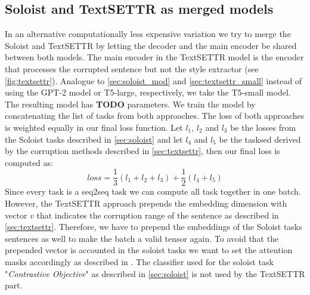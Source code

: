 \documentclass[twocolumn]{tum-article}
\begin{document}
\subsection{Soloist and TextSETTR as merged models}
In an alternative computationally less expensive variation we try to merge the Soloist and TextSETTR by letting the decoder and the main encoder be shared between both models. The main encoder in the TextSETTR model is the encoder that processes the corrupted sentence but not the style extractor (see \autoref{fig:textsettr}). Analogue to \autoref{sec:soloist_mod} and \autoref{sec:textsettr_small} instead of using the GPT-2 model or T5-large, respectively, we take the T5-small model. The resulting model has \textbf{TODO} parameters. We train the model by concatenating the list of tasks from both approaches. The loss of both approaches is weighted equally in our final loss function. Let $l_1$, $l_2$ and $l_3$ be the losses from the Soloist tasks described in \autoref{sec:soloist} and let $l_4$ and $l_5$ be the tasksed derived by the corruption methods described in \autoref{sec:textsettr}, then our final loss is computed as:
$$
loss = \frac{1}{3}(l_1 + l_2 + l_3) + \frac{1}{2} (l_4 + l_5)
$$
Since every task is a seq2seq task we can compute all task together in one batch. However, the TextSETTR approach prepends the embedding dimension with vector $v$ that indicates the corruption range of the sentence as described in \autoref{sec:textsettr}. Therefore, we have to prepend the embeddings of the Soloist tasks sentences as well to make the batch a valid tensor again. To avoid that the prepended vector is accounted in the soloist tasks we want to set the attention masks accordingly as described in \cite{vaswani2017attention}. The classifier used for the soloist task "\textit{Contrastive Objective}" as described in \autoref{sec:soloist} is not used by the TextSETTR part.
\end{document}
